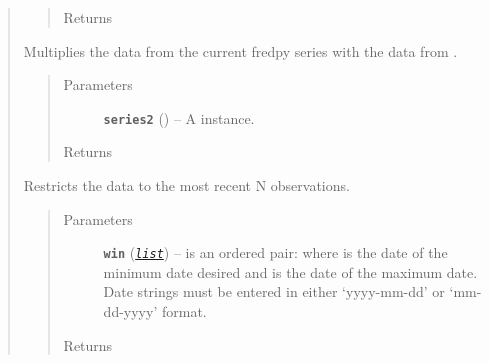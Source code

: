 \documentclass[letterpaper,10pt,openany,oneside]{sphinxmanual}
\begin{document}
\begin{fulllineitems}
\begin{quote}
\begin{fulllineitems}
\begin{quote}
\begin{description}
\item[{Returns}] \leavevmode


\end{description}\end{quote}

\end{fulllineitems}


\begin{fulllineitems}
\label{series_class:fredpy.series.times}
Multiplies the data from the current fredpy series with the data from .
\begin{quote}\begin{description}
\item[{Parameters}] \leavevmode
\textbf{\texttt{series2}} ({\hyperref[series_class:fredpy.series]{}}) -- A  instance.

\item[{Returns}] \leavevmode
{\hyperref[series_class:fredpy.series]{}}

\end{description}\end{quote}

\end{fulllineitems}


\begin{fulllineitems}
\label{series_class:fredpy.series.window}
Restricts the data to the most recent N observations.
\begin{quote}\begin{description}
\item[{Parameters}] \leavevmode
\textbf{\texttt{win}} (\href{https://docs.python.org/library/functions.html\#list}{\emph{\texttt{list}}}) -- is an ordered pair:  where  is the date of the minimum date desired and  is the date of the maximum date. Date strings must be entered in either `yyyy-mm-dd' or `mm-dd-yyyy' format.

\item[{Returns}] \leavevmode
{\hyperref[series_class:fredpy.series]{}}

\end{description}\end{quote}

\end{fulllineitems}

\end{quote}

\end{fulllineitems}
\end{document}
